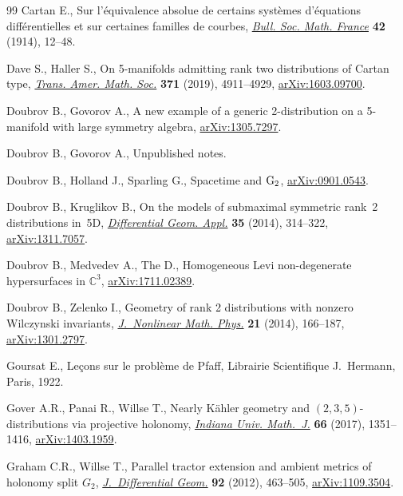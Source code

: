 \documentclass[pdftex]{sigma}
\numberwithin{equation}{section}
\begin{document}
\begin{thebibliography}{99}
Cartan E., Sur l'\'{e}quivalence absolue de certains syst\`emes d'\'{e}quations
 diff\'{e}rentielles et sur certaines familles de courbes, \href{https://doi.org/10.24033/bsmf.938}{\textit{Bull. Soc.
 Math. France}} \textbf{42} (1914), 12--48.

Dave S., Haller S., On 5-manifolds admitting rank two distributions of {C}artan
 type, \href{https://doi.org/10.1090/tran/7495}{\textit{Trans. Amer. Math. Soc.}} \textbf{371} (2019), 4911--4929,
 \href{https://arxiv.org/abs/1603.09700}{arXiv:1603.09700}.

Doubrov B., Govorov A., A new example of a generic 2-distribution on a
 5-manifold with large symmetry algebra, \href{https://arxiv.org/abs/1305.7297}{arXiv:1305.7297}.

Doubrov B., Govorov A., Unpublished notes.

Doubrov B., Holland J., Sparling G., Spacetime and ${\rm G}_2$,
 \href{https://arxiv.org/abs/0901.0543}{arXiv:0901.0543}.

Doubrov B., Kruglikov B., On the models of submaximal symmetric rank~2
 distributions in~5{D}, \href{https://doi.org/10.1016/j.difgeo.2014.06.008}{\textit{Differential Geom. Appl.}} \textbf{35} (2014),
 314--322, \href{https://arxiv.org/abs/1311.7057}{arXiv:1311.7057}.

Doubrov B., Medvedev A., The D., Homogeneous Levi non-degenerate hypersurfaces
 in ${\mathbb C}^3$, \href{https://arxiv.org/abs/1711.02389}{arXiv:1711.02389}.

Doubrov B., Zelenko I., Geometry of rank 2 distributions with nonzero
 {W}ilczynski invariants, \href{https://doi.org/10.1080/14029251.2014.900985}{\textit{J.~Nonlinear Math. Phys.}} \textbf{21}
 (2014), 166--187, \href{https://arxiv.org/abs/1301.2797}{arXiv:1301.2797}.

Goursat E., Le\c{c}ons sur le probl\`{e}me de {P}faff, Librairie Scientifique
 J.~Hermann, Paris, 1922.

Gover A.R., Panai R., Willse T., Nearly {K}\"{a}hler geometry and
 {$(2,3,5)$}-distributions via projective holonomy, \href{https://doi.org/10.1512/iumj.2017.66.6089}{\textit{Indiana Univ.
 Math.~J.}} \textbf{66} (2017), 1351--1416, \href{https://arxiv.org/abs/1403.1959}{arXiv:1403.1959}.

Graham C.R., Willse T., Parallel tractor extension and ambient metrics of
 holonomy split {$G_2$}, \href{https://doi.org/10.4310/jdg/1354110197}{\textit{J.~Differential Geom.}} \textbf{92} (2012),
 463--505, \href{https://arxiv.org/abs/1109.3504}{arXiv:1109.3504}.


\end{thebibliography}
\end{document}
